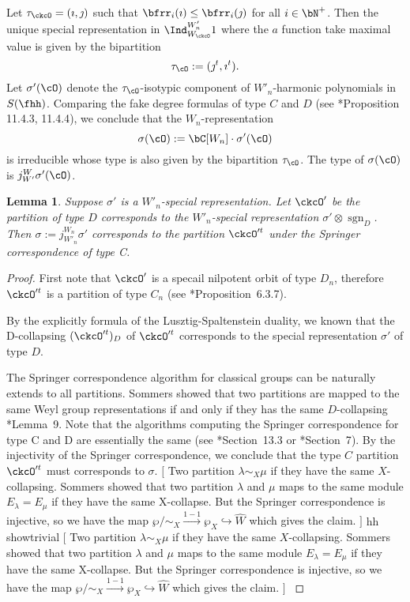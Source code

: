 \documentclass[12pt,a4paper]{amsart}
\newcommand{\trivial}[2][]{\if\relax\detokenize{#1}\relax
  {%
      \color{orange} \vspace{0em} $[$  #2 $]$
      \color{black}
  }
  \else
\ifx#1h
\ifcsname showtrivial\endcsname
{%
    \color{orange} \vspace{0em}  $[$ #2 $]$
    \color{black}
}
\fi
\else {\red Wrong argument!} \fi
\fi
}
\newcommand{\sgn}{\operatorname{sgn}}
\numberwithin{equation}{section}
\newtheorem{lem}[thm]{Lemma}
\theoremstyle{remark}
\begin{document}
Let $\tau_\ckcO  = (\imath,\jmath)$ such that $\bfrr_i(\imath)\leq \bfrr_i(\jmath)$ for all $i\in \bN^+$.
Then the unique special representation
in $\Ind_{W_\ckcO}^{W'_n} 1$ where the $a$ function take maximal value is given
by the bipartition
\[
  \tau_{\cO}:=(\jmath^t,\imath^t).
\]
Let $\sigma'(\cO)$ denote the $\tau_{\cO}$-isotypic component of $W'_n$-harmonic polynomials in $S(\fhh)$.
Comparing the  fake degree formulas of type $C$ and $D$ (see \cite{Carter}*{Proposition 11.4.3, 11.4.4}), we conclude that
the $W_n$-representation
\begin{equation}\label{eq:sigma.tC}
\sigma(\cO):= \bC[W_n]\cdot \sigma'(\cO)
\end{equation}
is irreducible whose type is also given by the
bipartition $\tau_{\cO}$. The type of $\sigma(\cO)$ is $j_{W'}^{W} \sigma'(\cO)$.

\begin{lem}\label{lem:MD1}
  Suppose $\sigma'$ is a $W'_n$-special representation.%
  Let $\ckcO'$ be the partition of type $D$ corresponds to the $W'_n$-special representation
  $\sigma'\otimes \sgn_D$. Then $\sigma:=j_{W'_n}^{W_n} \sigma'$ corresponds to the partition $\ckcO'^t$ under the Springer correspondence of
  type C.
\end{lem}
\begin{proof}
  First note that $\ckcO'$ is a specail nilpotent orbit of type $D_n$,
  therefore $\ckcO'^t$ is a partition of type $C_n$ (see \cite{CM}*{Proposition~6.3.7}).

  By the explicitly formula of the Lusztig-Spaltenstein duality, we known that the D-collapsing
  $(\ckcO'^t)_D$ of $\ckcO'^t$ corresponds to the special representation
  $\sigma'$ of type $D$.

  The Springer correspondence algorithm for classical groups can be naturally extends to all partitions.
  Sommers showed that two partitions are mapped to the same Weyl group representations
  if and only if they has the same $D$-collapsing \cite{So}*{Lemma~9}.
  Note that the algorithms computing the Springer correspondence for type C and D are essentially the same
  (see \cite{Carter}*{Section~13.3} or \cite{So}*{Section~7}).
  By the injectivity of the Springer correspondence, we conclude that the type $C$ partition $\ckcO'^t$
  must corresponds to $\sigma$.
  \trivial[h]{
    Two partition $\lambda\sim_X \mu$ if they have the same $X$-collapsing.
  Sommers showed that two partition $\lambda$ and $\mu$ maps to the same module $E_\lambda = E_\mu$
  if they have the same X-collapse. But the Springer correspondence is injective,
  so we have the map $\wp/\sim_X \xrightarrow{1-1} \wp_X \hookrightarrow \widehat{W}$
  which gives the claim.
  }
\end{proof}
\end{document}
